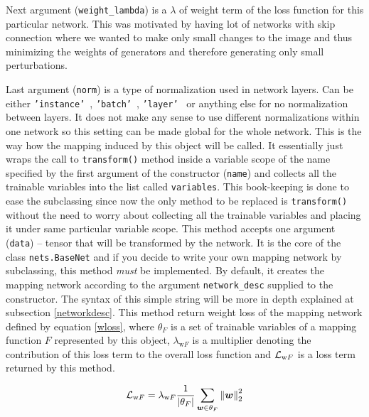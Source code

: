 \begin{itemize}
\begin{description}
Next argument (\texttt{weight\_lambda}) is a $\lambda$ of weight term of the loss function for this particular network. This was motivated by having lot of networks with skip connection where we wanted to make only small changes to the image and thus minimizing the weights of generators and therefore generating only small perturbations.

Last argument (\texttt{norm}) is a type of normalization used in network layers. Can be either \texttt{'instance'}~\cite{instancenorm}, \texttt{'batch'}~\cite{batchnorm}, \texttt{'layer'}~\cite{layernorm} or anything else for no normalization between layers. It does not make any sense to use different normalizations within one network so this setting can be made global for the whole network.
 This is the way how the mapping induced by this object will be called. It essentially just wraps the call to \texttt{transform()} method inside a variable scope of the name specified by the first argument of the constructor (\texttt{name}) and collects all the trainable variables into the list called \texttt{variables}. This book-keeping is done to ease the subclassing since now the only method to be replaced is \texttt{transform()} without the need to worry about collecting all the trainable variables and placing it under same particular variable scope.
 This method accepts one argument (\texttt{data}) -- tensor that will be transformed by the network. It is the core of the class \texttt{nets.BaseNet} and if you decide to write your own mapping network by subclassing, this method {\em must} be implemented. By default, it creates the mapping network according to the argument \texttt{network\_desc} supplied to the constructor. The syntax of this simple string will be more in depth explained at subsection \ref{networkdesc}.
 This method return weight loss of the mapping network defined by equation \ref{wloss}, where $\theta_F$ is a set of trainable variables of a mapping function $F$ represented by this object, $\lambda_{\text{w}F}$ is a multiplier denoting the contribution of this loss term to the overall loss function and $\mathcal{L}_{\text{w}F}$ is a loss term returned by this method.

\begin{equation}
\mathcal{L}_{\text{w}F} = \lambda_{\text{w}F} \frac{1}{|\theta_F|} \sum_{\bm{w} \in \theta_F} \left\lVert\bm{w}\right\rVert_2^2
\label{wloss}
\end{equation}

\end{description}


\end{itemize}
